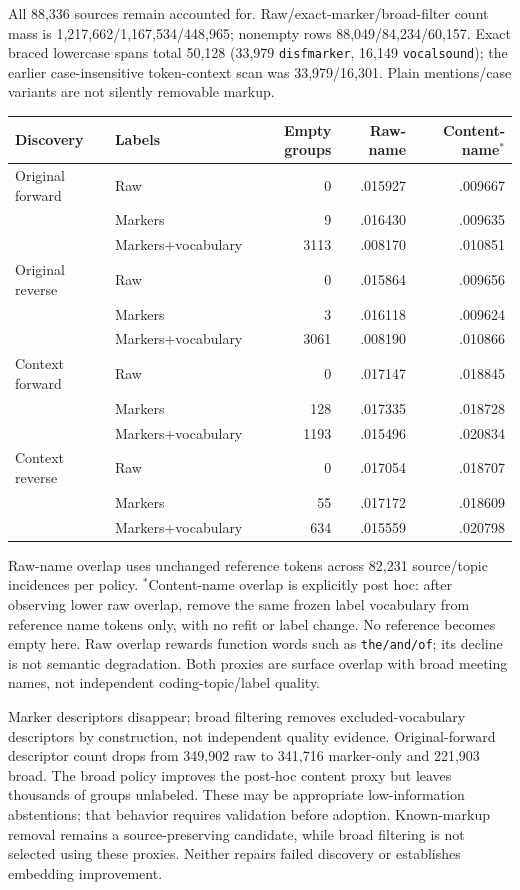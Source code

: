 \documentclass[11pt]{article}
\begin{document}
All 88,336 sources remain accounted for. Raw/exact-marker/broad-filter count mass
is 1,217,662/1,167,534/448,965; nonempty rows 88,049/84,234/60,157. Exact braced
lowercase spans total 50,128 (33,979 \texttt{disfmarker}, 16,149
\texttt{vocalsound}); the earlier case-insensitive token-context scan was
33,979/16,301. Plain mentions/case variants are not silently removable markup.

\begin{center}
\begin{tabular}{llrrr}
Discovery & Labels & Empty groups & Raw-name & Content-name$^*$\\\hline
Original forward & Raw & 0 & .015927 & .009667\\
 & Markers & 9 & .016430 & .009635\\
 & Markers+vocabulary & 3113 & .008170 & .010851\\
Original reverse & Raw & 0 & .015864 & .009656\\
 & Markers & 3 & .016118 & .009624\\
 & Markers+vocabulary & 3061 & .008190 & .010866\\
Context forward & Raw & 0 & .017147 & .018845\\
 & Markers & 128 & .017335 & .018728\\
 & Markers+vocabulary & 1193 & .015496 & .020834\\
Context reverse & Raw & 0 & .017054 & .018707\\
 & Markers & 55 & .017172 & .018609\\
 & Markers+vocabulary & 634 & .015559 & .020798
\end{tabular}
\end{center}
Raw-name overlap uses unchanged reference tokens across 82,231 source/topic
incidences per policy. $^*$Content-name overlap is explicitly post hoc: after
observing lower raw overlap, remove the same frozen label vocabulary from
reference name tokens only, with no refit or label change. No reference becomes
empty here. Raw overlap rewards function words such as \texttt{the/and/of};
its decline is not semantic degradation. Both proxies are surface overlap with
broad meeting names, not independent coding-topic/label quality.

Marker descriptors disappear; broad filtering removes excluded-vocabulary
descriptors by construction, not independent quality evidence. Original-forward
descriptor count drops from 349,902 raw to 341,716 marker-only and 221,903 broad.
The broad policy improves the post-hoc content proxy but leaves thousands of
groups unlabeled. These may be appropriate low-information abstentions; that
behavior requires validation before adoption. Known-markup removal remains a
source-preserving candidate, while broad filtering is not selected using these
proxies. Neither repairs failed discovery or establishes embedding improvement.
\end{document}
